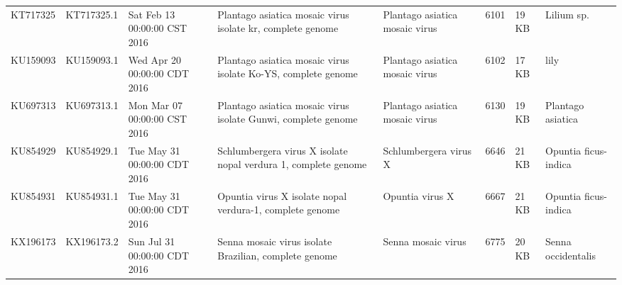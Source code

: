 \documentclass[11pt]{article}
\begin{document}
\begin{supptable}[ht]
{\begin{tabular}{@{}llllllll@{}}
KT717325 & KT717325.1 & Sat Feb 13 00:00:00 CST 2016 & Plantago asiatica mosaic virus isolate kr, complete genome                                                                                                                                                                                                       & Plantago asiatica mosaic virus & 6101            & 19 KB & Lilium sp.                            \\
KU159093 & KU159093.1 & Wed Apr 20 00:00:00 CDT 2016 & Plantago asiatica mosaic virus isolate Ko-YS, complete genome                                                                                                                                                                                                    & Plantago asiatica mosaic virus & 6102            & 17 KB & lily                                  \\
KU697313 & KU697313.1 & Mon Mar 07 00:00:00 CST 2016 & Plantago asiatica mosaic virus isolate Gunwi, complete genome                                                                                                                                                                                                    & Plantago asiatica mosaic virus & 6130            & 19 KB & Plantago asiatica                     \\
KU854929 & KU854929.1 & Tue May 31 00:00:00 CDT 2016 & Schlumbergera virus X isolate nopal verdura 1, complete genome                                                                                                                                                                                                   & Schlumbergera virus X          & 6646            & 21 KB & Opuntia ficus-indica                  \\
KU854931 & KU854931.1 & Tue May 31 00:00:00 CDT 2016 & Opuntia virus X isolate nopal verdura-1, complete genome                                                                                                                                                                                                         & Opuntia virus X                & 6667            & 21 KB & Opuntia ficus-indica                  \\
KX196173 & KX196173.2 & Sun Jul 31 00:00:00 CDT 2016 & Senna mosaic virus isolate Brazilian, complete genome                                                                                                                                                                                                            & Senna mosaic virus             & 6775            & 20 KB & Senna occidentalis                    \\

\end{tabular}}
\end{supptable}
\end{document}
